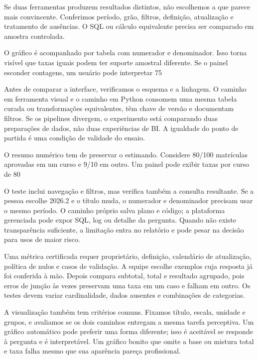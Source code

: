 Se duas ferramentas produzem resultados distintos, não escolhemos a que parece mais convincente. Conferimos período, grão, filtros, definição, atualização e tratamento de ausências. O SQL ou cálculo equivalente precisa ser comparado em amostra controlada.

O gráfico é acompanhado por tabela com numerador e denominador. Isso torna visível que taxas iguais podem ter suporte amostral diferente. Se o painel esconder contagens, um usuário pode interpretar 75%

Antes de comparar a interface, verificamos o esquema e a linhagem. O caminho em ferramenta visual e o caminho em Python consomem uma mesma tabela curada ou transformações equivalentes, têm chave de versão e documentam filtros. Se os pipelines divergem, o experimento está comparando duas preparações de dados, não duas experiências de BI. A igualdade do ponto de partida é uma condição de validade do ensaio.

O resumo numérico tem de preservar o estimando. Considere 80/100 matrículas aprovadas em um curso e 9/10 em outro. Um painel pode exibir taxas por curso de 80%

O teste inclui navegação e filtros, mas verifica também a consulta resultante. Se a pessoa escolhe 2026.2 e o título muda, o numerador e denominador precisam usar o mesmo período. O caminho próprio salva plano e código; a plataforma gerenciada pode expor SQL, log ou detalhe da pergunta. Quando não existe transparência suficiente, a limitação entra no relatório e pode pesar na decisão para usos de maior risco.

Uma métrica certificada requer proprietário, definição, calendário de atualização, política de nulos e casos de validação. A equipe escolhe exemplos cuja resposta já foi conferida à mão. Depois compara subtotal, total e resultado agrupado, pois erros de junção às vezes preservam uma taxa em um caso e falham em outro. Os testes devem variar cardinalidade, dados ausentes e combinações de categorias.

A visualização também tem critérios comuns. Fixamos título, escala, unidade e grupos, e avaliamos se os dois caminhos entregam a mesma tarefa perceptiva. Um gráfico automático pode preferir uma forma diferente; isso é aceitável se responde à pergunta e é interpretável. Um gráfico bonito que omite a base ou mistura total e taxa falha mesmo que sua aparência pareça profissional.

